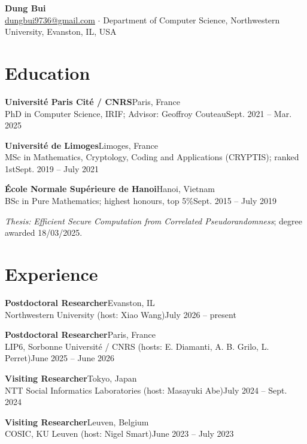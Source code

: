 \documentclass[11pt]{article}
\newcommand{\entry}[4]{%
  \noindent\textbf{#1}\hfill #2\\[0.15em]
  \noindent #3\hfill #4\par\vspace{0.45em}}
\begin{document}
\begin{center}
  {\LARGE\bfseries Dung Bui}\\[0.5em]
  \href{mailto:dungbui9736@gmail.com}{dungbui9736@gmail.com} \quad$\cdot$\quad
  Department of Computer Science, Northwestern University, Evanston, IL, USA
\end{center}
\vspace{0.5em}

\section{Education}

\entry{Universit\'e Paris Cit\'e / CNRS}{Paris, France}
      {PhD in Computer Science, IRIF; Advisor: Geoffroy Couteau}{Sept. 2021 -- Mar. 2025}

\entry{Universit\'e de Limoges}{Limoges, France}
      {MSc in Mathematics, Cryptology, Coding and Applications (CRYPTIS); ranked 1st}{Sept. 2019 -- July 2021}

\entry{\'Ecole Normale Sup\'erieure de Hanoi}{Hanoi, Vietnam}
      {BSc in Pure Mathematics; highest honours, top 5\%}{Sept. 2015 -- July 2019}

\smallskip
\textit{Thesis:} \emph{Efficient Secure Computation from Correlated Pseudorandomness};
degree awarded 18/03/2025.

\section{Experience}

\entry{Postdoctoral Researcher}{Evanston, IL}
      {Northwestern University (host: Xiao Wang)}{July 2026 -- present}

\entry{Postdoctoral Researcher}{Paris, France}
      {LIP6, Sorbonne Universit\'e / CNRS (hosts: E. Diamanti, A. B. Grilo, L. Perret)}{June 2025 -- June 2026}

\entry{Visiting Researcher}{Tokyo, Japan}
      {NTT Social Informatics Laboratories (host: Masayuki Abe)}{July 2024 -- Sept. 2024}

\entry{Visiting Researcher}{Leuven, Belgium}
      {COSIC, KU Leuven (host: Nigel Smart)}{June 2023 -- July 2023}
\end{document}

